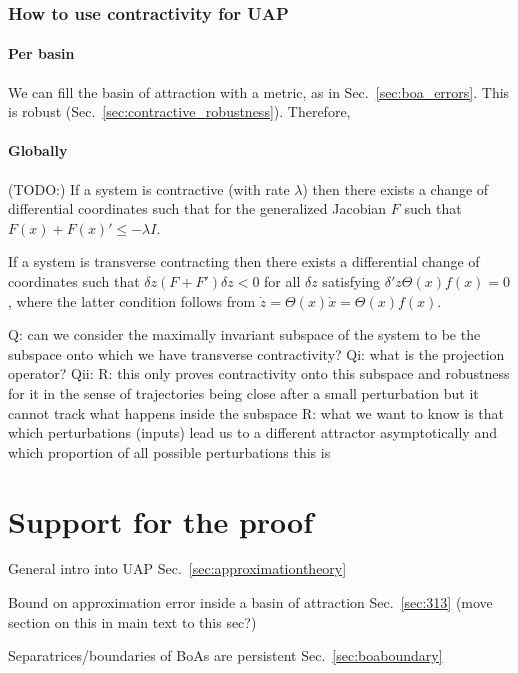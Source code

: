 \documentclass{article}
\newcommand{\ascomment}[1]{\textcolor{ascolor}{(#1)}}
\theoremstyle{definition} \newtheorem{definition}{Definition}
\theoremstyle{remark} \newtheorem{remark}{Remark}
\newcounter{ct}
\begin{document}
\subsubsection{How to use contractivity for UAP}
\paragraph{Per basin}
We can fill the basin of attraction with a metric, as in Sec.~\ref{sec:boa_errors}.
This is robust (Sec.~\ref{sec:contractive_robustness}).
Therefore, 


\paragraph{Globally}
\ascomment{TODO:}
If a system is contractive (with rate $\lambda$) then there exists a change of differential coordinates %
such that for the generalized Jacobian $F$ such that $F(x)+F (x)' \leq  -\lambda I$.

If a system is transverse contracting then there exists a differential change of coordinates such that $\delta z(F + F')\delta z < 0$ for all $\delta z$ satisfying $\delta' z \Theta(x)f (x) = 0$, where the latter condition follows from  $\dot z= \Theta(x) \dot x = \Theta(x)f (x)$.

Q: can we consider the maximally invariant subspace of the system to be the subspace onto which we have transverse contractivity?
Qi: what is the projection operator?
Qii: 
R: this only proves contractivity onto this subspace and robustness for it in the sense of trajectories being close after a small perturbation but it cannot track what happens inside the subspace
R: what we want to know is that which perturbations (inputs) lead us to a different attractor asymptotically and which proportion of all possible perturbations this is 






\newpage
\section{Support for the proof}
General intro into UAP Sec.~\ref{sec:approximationtheory}

Bound on approximation error inside a basin of attraction Sec.~\ref{sec:313} \ascomment{move section on this in main text to this sec?}

Separatrices/boundaries of BoAs are persistent Sec.~\ref{sec:boaboundary}
\end{document}
